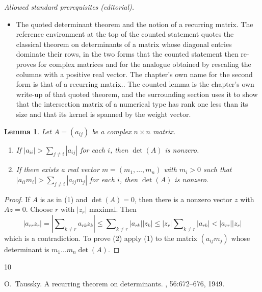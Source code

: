 \documentclass[10pt,a4paper]{amsart}
\theoremstyle{plain}
\newtheorem{lemma}[subsection]{Lemma}
\theoremstyle{definition}
\theoremstyle{remark}
\numberwithin{equation}{subsection}
\newenvironment{reference}{}{}
\begin{document}
\noindent\textit{Allowed standard prerequisites (editorial).}\begin{itemize}
\item The quoted determinant theorem and the notion of a recurring matrix. The reference environment at the top of the counted statement quotes the classical theorem on determinants of a matrix whose diagonal entries dominate their rows, in the two forms that the counted statement then re-proves for complex matrices and for the analogue obtained by rescaling the columns with a positive real vector. The chapter's own name for the second form is that of a recurring matrix.. The counted lemma is the chapter's own write-up of that quoted theorem, and the surrounding section uses it to show that the intersection matrix of a numerical type has rank one less than its size and that its kernel is spanned by the weight vector.
\end{itemize}\medskip
\begin{lemma}
\label{lemma-recurring}
\begin{reference}
\cite[Theorem I]{Taussky}
\end{reference}
Let $A = (a_{ij})$ be a complex $n \times n$ matrix.
\begin{enumerate}
\item If $|a_{ii}| > \sum_{j \not = i} |a_{ij}|$ for each $i$, then
$\det(A)$ is nonzero.
\item If there exists a real vector $m = (m_1, \ldots, m_n)$
with $m_i > 0$ such that $|a_{ii} m_i| > \sum_{j \not = i} |a_{ij}m_j|$
for each $i$, then $\det(A)$ is nonzero.
\end{enumerate}
\end{lemma}

\begin{proof}
If $A$ is as in (1) and $\det(A) = 0$, then there is a nonzero vector
$z$ with $Az = 0$. Choose $r$ with $|z_r|$ maximal. Then
$$
|a_{rr} z_r| = |\sum\nolimits_{k \not = r} a_{rk}z_k| \leq
\sum\nolimits_{k \not = r} |a_{rk}||z_k| \leq
|z_r| \sum\nolimits_{k \not = r} |a_{rk}| < |a_{rr}||z_r|
$$
which is a contradiction. To prove (2) apply (1) to the matrix
$(a_{ij}m_j)$ whose determinant is $m_1 \ldots m_n \det(A)$.
\end{proof}

\begin{thebibliography}{10}

O.~Taussky.
\newblock A recurring theorem on determinants.
, 56:672--676, 1949.

\end{thebibliography}
\end{document}
